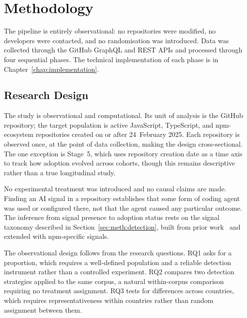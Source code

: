 
\chapter{Methodology}
\label{chap:methodology}

The pipeline is entirely observational: no repositories were modified, no developers were contacted, and no randomisation was introduced. Data was collected through the GitHub GraphQL and REST APIs and processed through four sequential phases. The technical implementation of each phase is in Chapter~\ref{chap:implementation}.

\section{Research Design}
\label{sec:meth:design}

The study is observational and computational. Its unit of analysis is the GitHub repository; the target population is active JavaScript, TypeScript, and npm-ecosystem repositories created on or after 24~February 2025. Each repository is observed once, at the point of data collection, making the design cross-sectional. The one exception is Stage~5, which uses repository creation date as a time axis to track how adoption evolved across cohorts, though this remains descriptive rather than a true longitudinal study.

No experimental treatment was introduced and no causal claims are made. Finding an AI signal in a repository establishes that some form of coding agent was used or configured there, not that the agent caused any particular outcome. The inference from signal presence to adoption status rests on the signal taxonomy described in Section~\ref{sec:meth:detection}, built from prior work~\cite{robbesHeuristics2026, galsterConfig2026} and extended with npm-specific signals.

The observational design follows from the research questions. RQ1 asks for a proportion, which requires a well-defined population and a reliable detection instrument rather than a controlled experiment. RQ2 compares two detection strategies applied to the same corpus, a natural within-corpus comparison requiring no treatment assignment. RQ3 tests for differences across countries, which requires representativeness within countries rather than random assignment between them.

